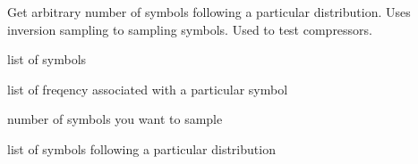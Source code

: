 \documentclass[letterpaper,10pt,english]{sphinxmanual}
\begin{document}

\begin{fulllineitems}
\label{\detokenize{utils:utils.utils.get_symbols}}
\pysigstartsignatures
{}
\pysigstopsignatures
\sphinxAtStartPar
Get arbitrary number of symbols following a particular distribution. Uses inversion sampling to sampling symbols. Used to test compressors.
\begin{description}
\begin{description}
\sphinxAtStartPar
list of symbols

\sphinxAtStartPar
list of freqency associated with a particular symbol

\sphinxAtStartPar
number of symbols you want to sample

\end{description}

\begin{description}
\sphinxAtStartPar
list of symbols following a particular distribution

\end{description}

\end{description}

\begin{sphinxVerbatim}[commandchars=\\\{\}]
\PYG{p}{[}    \PYG{p}{]} \PYG{p}{[}\PYG{p}{]} 
\end{sphinxVerbatim}

\end{fulllineitems}
\end{document}
